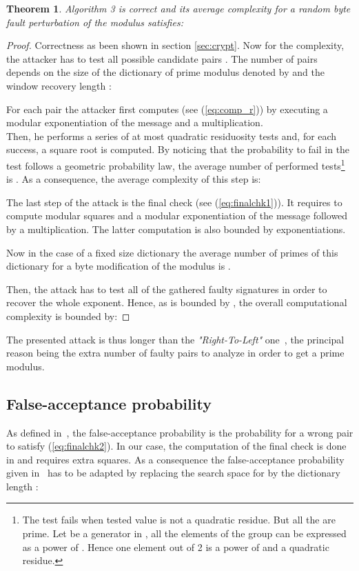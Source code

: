 \documentclass{article}
\newtheorem{theorem}{Theorem}
\begin{document}
\begin{theorem}Algorithm 3 is correct and its average complexity for a random byte fault perturbation of the modulus satisfies:
 \end{theorem}
\begin{proof}Correctness as been shown in section \ref{sec:crypt}. 
Now for the complexity, the attacker has to test all possible
candidate pairs .
The number of pairs depends on the size of the dictionary of prime
modulus denoted by  and the window recovery length :


For each pair the attacker first computes  (see (\ref{eq:comp_r})) by executing a modular exponentiation of the message and a multiplication.\\
Then, he performs a series of at most  
quadratic residuosity tests and, for
each success, a square root is computed. By noticing that the
probability to fail in the test follows a geometric probability law,
the average number of performed tests\footnote[4]{The test fails when tested
  value is not a quadratic residue. But all the  are prime.
Let be  a generator in , all the
elements of the group can be expressed as a power of . Hence
one element out of 2 is a power of  and a quadratic
residue.} is .
 As a consequence, the average complexity of this step
is:

The last step of the attack is the final check (see
(\ref{eq:finalchk1})). It requires to compute  modular squares
and a modular exponentiation of the message followed by a
multiplication. The latter computation is also bounded by 
 exponentiations. 

Now in the case of a fixed size dictionary the average number of
primes of this dictionary for a byte modification of the modulus is
.

Then, the  attack has to test all of the
gathered faulty signatures in order to recover the whole exponent.
Hence, as  is bounded by , the overall
computational complexity is bounded by:

\end{proof}

The presented attack is thus longer than the
\textit{"Right-To-Left"} one~\cite{77}, the principal reason being
the extra number of faulty pairs to analyze in order to get a prime modulus.

\subsection{False-acceptance probability}
\label{sec:proba}
As defined in~\cite{77}, the false-acceptance probability is the probability for a wrong pair  to satisfy (\ref{eq:finalchk2}). In our case, the computation of the final check is done in  and requires extra squares. As a consequence the false-acceptance probability given in~\cite{77} has to be adapted by replacing the search space for  by the dictionary length : 
\end{document}
